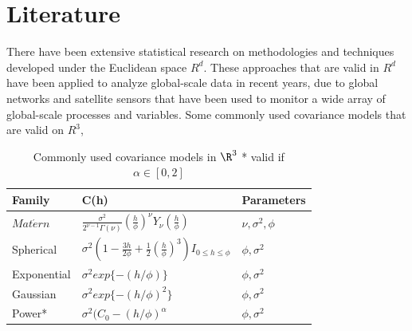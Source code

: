 % 


\section{Literature}

There have been extensive statistical research on methodologies and techniques developed under the Euclidean space $R^d$. These approaches that are valid in $R^d$ have been applied to analyze global-scale data in recent years, due to global networks and satellite sensors that have been used to monitor a wide array of global-scale processes and variables. Some commonly used covariance models that are valid on $R^3$, 

\begin{table}[H]
\label{parameters}
\centering
\begin{tabular}{l|l|l}
\hline 
Family & C(h)  & Parameters \\ \hline \hline
$Mat\acute{e}rn$ &  $\frac{\sigma^2}{2^{\nu-1}\Gamma(\nu)} (\frac{h}{\phi})^{\nu} Y_{\nu}(\frac{h}{\phi})$  & $\nu, \sigma^2, \phi$  \\ 

Spherical & $\sigma^2(1-\frac{3h}{2\phi}+\frac{1}{2}(\frac{h}{\phi})^3)I_{0\le h\le \phi}$ & $\phi, \sigma^2$ \\

Exponential & $\sigma^2exp\{-(h/\phi)\}$ & $\phi, \sigma^2$  \\

Gaussian & $\sigma^2exp \{-(h/\phi)^2\}$ & $\phi, \sigma^2$  \\

Power* & $\sigma^2(C_0-(h/\phi)^{\alpha}$ & $\phi, \sigma^2$ \\ \hline
\end{tabular}
\caption{Commonly used covariance models in $\R^3$ * valid if $\alpha\in [0,2]$ }
\end{table}

